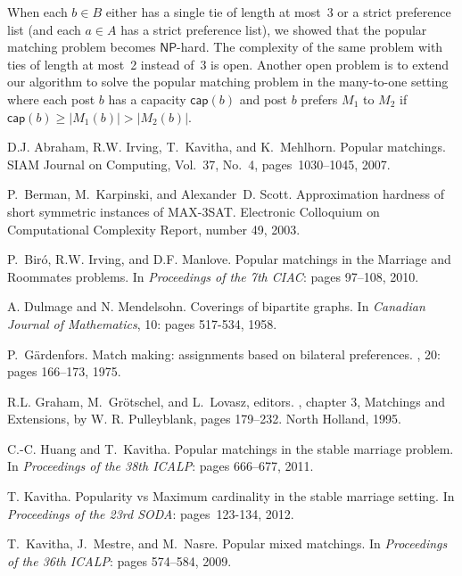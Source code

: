\documentclass[11pt]{llncs}
\newcommand{\capac}{\mathsf{cap}}
\begin{document}
When each $b \in B$ either has a single tie of length at most~3 or a strict preference list (and each $a \in A$ has a strict preference list), we showed that the popular matching problem becomes $\mathsf{NP}$-hard. The complexity of the same problem with ties of length at most~2 instead of~3 is open. 
Another open problem is to extend our algorithm to solve the popular matching problem in the many-to-one 
setting where each post $b$ has a capacity $\capac(b)$
and post $b$ prefers $M_1$ to $M_2$ if $\capac(b) \ge |M_1(b)| > |M_2(b)|$. 


\begin{thebibliography}{10}


D.J. Abraham, R.W. Irving, T.~Kavitha, and K.~Mehlhorn.
\newblock Popular matchings.
\newblock SIAM Journal on Computing, Vol.~37, No.~4, pages~1030--1045, 2007.

P.~Berman, M.~Karpinski, and Alexander~D. Scott.
\newblock Approximation hardness of short symmetric instances of {MAX-3SAT}.
\newblock Electronic Colloquium on Computational Complexity Report, number 49,
  2003.

P.~Bir\'o, R.W. Irving, and D.F. Manlove.
\newblock Popular matchings in the {M}arriage and {R}oommates problems.
\newblock In {\em Proceedings of the 7th CIAC}: pages 97--108, 2010.

A. Dulmage and N. Mendelsohn. 
Coverings of bipartite graphs. 
In {\em Canadian Journal of Mathematics}, 10: pages 517-534, 1958. 

P.~G\"{a}rdenfors.
\newblock Match making: assignments based on bilateral preferences.
, 20: pages 166--173, 1975.

R.L. Graham, M.~Gr\"{o}tschel, and L.~Lovasz, editors.
, chapter 3, Matchings and
  Extensions, by W. R. Pulleyblank, pages 179--232.
\newblock North Holland, 1995.

C.-C. Huang and T.~Kavitha.
\newblock Popular matchings in the stable marriage problem.
\newblock In {\em Proceedings of the 38th ICALP}: pages 666--677, 2011.

T. Kavitha.
\newblock Popularity vs Maximum cardinality in the stable marriage setting.
\newblock  In {\em Proceedings of the 23rd SODA}: pages~123-134, 2012.

T.~Kavitha, J.~Mestre, and M.~Nasre.
\newblock Popular mixed matchings.
\newblock In {\em Proceedings of the 36th ICALP}: pages 574--584, 2009.


\end{thebibliography}
\end{document}
